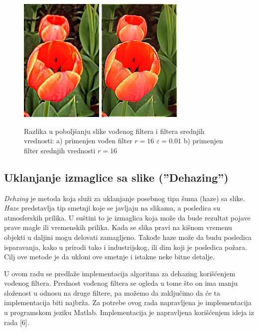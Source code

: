 \documentclass[a4paper,12pt,titlepage]{article}
\begin{document}
\begin{figure}[ht!]
\centering
\includegraphics[width=40mm]{img/flowerER.png}
\includegraphics[width=40mm]{img/flowerERAvg.png}
\caption{Razlika u poboljšanju slike vođenog filtera i filtera srednjih vrednosti: a) primenjen vođen filter $r = 16$ $\varepsilon = 0.01$ b) primenjen filter srednjih vrednosti $r = 16$ }
\label{enha1}
\end{figure}

\newpage
\subsection{Uklanjanje izmaglice sa slike (''Dehazing'')}%

\emph{Dehzing} je metoda koja služi za uklanjanje posebnog tipa šuma (haze) sa slike. \emph{Haze} predstavlja tip smetnji koje se javljaju na slikama, a posledica su atmosferskih prilika. U suštini to je izmaglica koja može da bude rezultat pojave prave magle ili vremenskih prilika. Kada se slika pravi na kišnom vremenu objekti u daljini mogu delovati zamagljeno. Takođe haze može da budu posledica isparavanja, kako u prirodi tako i industrijskog, ili dim koji je posledica požara. Cilj ove metode je da ukloni ove smetnje i istakne neke bitne detalje.

U ovom radu se predlaže implementacija algoritma za dehazing korišćenjem vođenog filtera. Prednost vođenog filtera se ogleda u tome što on ima manju složenost u odnosu na druge filtere, pa možemo da zaključimo da će ta implementacija biti najbrža. Za potrebe ovog rada napravljena je implementacija u programskom jeziku Matlab. Implementacija je napravljena korišćenjem ideja iz rada [6]. 
\end{document}
